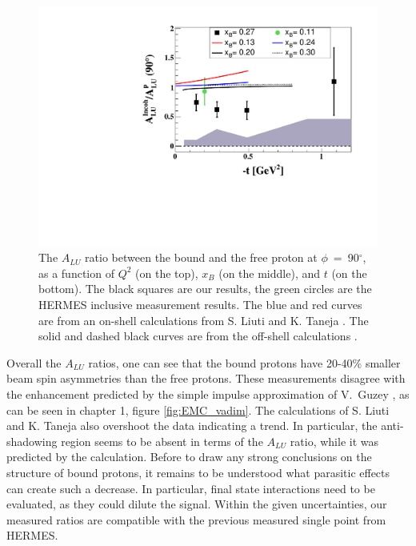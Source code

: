\begin{figure}[tp]
\includegraphics[scale=0.46]{fig_Dec2016/ALU_ratioInc_t_shortscenrario.pdf}
\caption{ The $A_{LU}$ ratio between the bound and the free proton at 
   $\phi$~=~90$^{\circ}$, as a function of $Q^2$ (on the top), $x_B$ (on the 
   middle), and $t$ (on the bottom). The black squares are our results, the 
   green circles are the HERMES inclusive measurement \cite{HERMES_BSA} 
   results.  The blue and red curves are from an on-shell calculations from S.  
Liuti and K. Taneja \cite{simonetta_2}. The solid and dashed black curves are 
from the off-shell calculations \cite{EMC_vadim_2}.} 
\label{fig:incoh_EMC_ratio_ALU_proton}
\end{figure}

Overall the $A_{LU}$ ratios, one can see that the bound protons 
have 20-40$\%$ smaller beam spin asymmetries than the free protons. These measurements 
disagree with the enhancement predicted by the simple impulse approximation of 
V.~Guzey \cite{EMC_vadim_2}, as can be seen in chapter 1, figure 
\ref{fig:EMC_vadim}. The calculations of S. Liuti and K. Taneja \cite{simonetta_2}
also overshoot the data indicating a trend. In particular, the 
anti-shadowing region seems to be absent in terms of the $A_{LU}$ ratio, while
it was predicted by the calculation. Before to draw any strong conclusions on the 
structure of bound protons, it remains to be understood what parasitic
effects can create such a decrease. In particular, final state interactions need
to be evaluated, as they could dilute the signal.  Within the given 
uncertainties, our measured ratios are compatible with the previous measured 
single point from HERMES.


